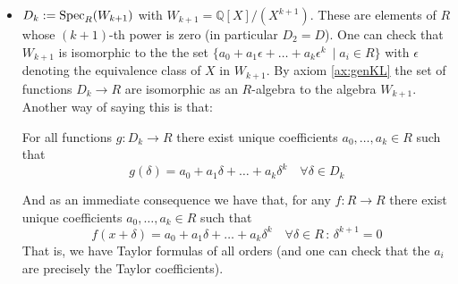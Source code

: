 \begin{itemize}
  \item \( D_k := \operatorname{Spec}_R(W_{k+1}) \) with \( W_{k+1} = \mathbb{Q}[X]/(X^{k+1}) \). These are elements of \( R \) whose \( (k+1) \)-th power is zero (in particular \( D_2 = D \)). One can check that \( W_{k+1} \) is isomorphic to the the set \( \{a_0+a_1\epsilon + \dots + a_k\epsilon^k\ \mid a_i\in R\} \) with \( \epsilon \) denoting the equivalence class of \( X \) in \( W_{k+1} \). By axiom \ref{ax:genKL} the set of functions \( D_k\to R \) are isomorphic as an \( R \)-algebra to the algebra \( W_{k+1} \). Another way of saying this is that:
    \begin{proposition}
      For all functions \( g:D_k\to R \) there exist unique coefficients \( a_0,\dots,a_k\in R \) such that
      \begin{equation*}
	 g(\delta) = a_0 + a_1\delta + \dots + a_k\delta^k \quad \forall\delta\in D_k
      \end{equation*}
    \end{proposition}
    And as an immediate consequence we have that, for any \( f:R\to R \) there exist unique coefficients \( a_0,\dots,a_k\in R \) such that
    \begin{equation*}
      f(x+\delta) = a_0 + a_1\delta + \dots + a_k\delta^k \quad \forall \delta\in R\, :\, \delta^{k+1}=0
    \end{equation*}
    That is, we have Taylor formulas of all orders (and one can check that the \( a_i \) are precisely the Taylor coefficients).


\end{itemize}
